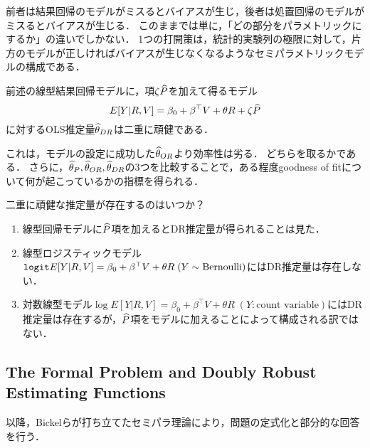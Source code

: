 \documentclass[uplatex,dvipdfmx]{jsreport}
\begin{document}
\begin{remarks}
    前者は結果回帰のモデルがミスるとバイアスが生じ，後者は処置回帰のモデルがミスるとバイアスが生じる．
このままでは単に，「どの部分をパラメトリックにするか」の違いでしかない．
1つの打開策は，統計的実験列の極限に対して，片方のモデルが正しければバイアスが生じなくなるようなセミパラメトリックモデルの構成である．
\end{remarks}

\begin{example}
    前述の線型結果回帰モデルに，項$\zeta\widehat{P}$を加えて得るモデル
    \[E[Y|R,V]=\beta_0+\beta^\top V+\theta R+\zeta\widehat{P}\]
    に対するOLS推定量$\widehat{\theta}_{DR}$は二重に頑健である．
\end{example}
\begin{remarks}
    これは，モデルの設定に成功した$\widehat{\theta}_{OR}$より効率性は劣る．
    どちらを取るかである．
    さらに，$\widehat{\theta}_P,\widehat{\theta}_{OR},\widehat{\theta}_{DR}$の3つを比較することで，ある程度goodness of fitについて何が起こっているかの指標を得られる．
\end{remarks}

\begin{problem}
    二重に頑健な推定量が存在するのはいつか？
    \begin{enumerate}
        \item 線型回帰モデルに$\widehat{P}$項を加えるとDR推定量が得られることは見た．
        \item 線型ロジスティックモデル$\mathtt{logit} E[Y|R,V]=\beta_0+\beta^\top V+\theta R\;(Y\sim\mathrm{Bernoulli})$にはDR推定量は存在しない．
        \item 対数線型モデル$\log E[Y|R,V]=\beta_0+\beta^\top V+\theta R\;(Y:\text{count variable})$にはDR推定量は存在するが，$\widehat{P}$項をモデルに加えることによって構成される訳ではない．
    \end{enumerate}
\end{problem}

\subsection{The Formal Problem and Doubly Robust Estimating Functions}

\begin{tcolorbox}[colframe=ForestGreen, colback=ForestGreen!10!white,breakable,colbacktitle=ForestGreen!40!white,coltitle=black,fonttitle=\bfseries\sffamily,
title=]
    以降，Bickelらが打ち立てたセミパラ理論により，問題の定式化と部分的な回答を行う．
\end{tcolorbox}
\end{document}
